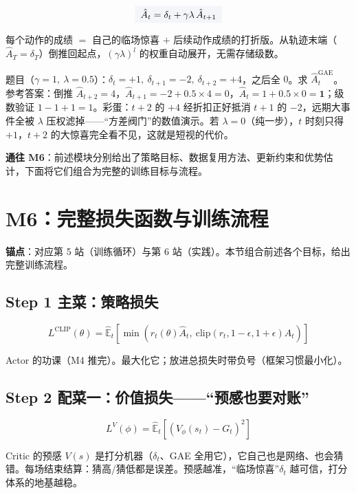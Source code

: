 \documentclass[UTF8,12pt,a4paper]{ctexrep}
\renewcommand{\boxed}[1]{{\colorbox{lightgray}{$\displaystyle #1$}}}
\newcommand{\plain}[1]{\begin{plainbox}#1\end{plainbox}}
\newcommand{\selfcheck}[1]{\begin{checkb}#1\end{checkb}}
\begin{document}
$$
\boxed{\;\hat{A}_t = \delta_t + \gamma\lambda\, \hat{A}_{t+1}\;}
$$

\plain{每个动作的成绩 $=$ 自己的临场惊喜 $+$ 后续动作成绩的打折版。从轨迹末端（$\hat{A}_T = \delta_T$）倒推回起点，$(\gamma\lambda)^l$ 的权重自动展开，无需存储级数。}

\selfcheck{题目（$\gamma=1,\ \lambda=0.5$）：$\delta_t = +1,\ \delta_{t+1} = -2,\ \delta_{t+2} = +4$，之后全 $0$。求 $\hat{A}^{\mathrm{GAE}}_t$。\quad 参考答案：倒推 $\hat{A}_{t+2} = 4$，$\hat{A}_{t+1} = -2 + 0.5\times 4 = 0$，$\hat{A}_t = 1 + 0.5\times 0 = \mathbf{1}$；级数验证 $1 - 1 + 1 = 1$。彩蛋：$t+2$ 的 $+4$ 经折扣正好抵消 $t+1$ 的 $-2$，远期大事件全被 $\lambda$ 压权滤掉——``方差阀门''的数值演示。若 $\lambda = 0$（纯一步），$t$ 时刻只得 $+1$，$t+2$ 的大惊喜完全看不见，这就是短视的代价。}

\textbf{通往 M6}：前述模块分别给出了策略目标、数据复用方法、更新约束和优势估计，下面将它们组合为完整的训练目标与流程。

\section{M6：完整损失函数与训练流程}

\textbf{锚点}：对应第 5 站（训练循环）与第 6 站（实践）。本节组合前述各个目标，给出完整训练流程。

\subsection*{Step 1 \; 主菜：策略损失}

$$
L^{\mathrm{CLIP}}(\theta) = \hat{\mathbb{E}}_t\left[\min\left(r_t(\theta)\hat{A}_t,\ \mathrm{clip}(r_t,1-\epsilon,1+\epsilon)\hat{A}_t\right)\right]
$$

Actor 的功课（M4 推完）。最大化它；放进总损失时带负号（框架习惯最小化）。

\subsection*{Step 2 \; 配菜一：价值损失——``预感也要对账''}

$$
L^{V}(\phi) = \hat{\mathbb{E}}_t\left[\left(V_\phi(s_t) - G_t\right)^2\right]
$$

\plain{Critic 的预感 $V(s)$ 是打分机器（$\delta_t$、GAE 全用它），它自己也是网络、也会猜错。每场结束结算：猜高/猜低都是误差。预感越准，``临场惊喜''$\delta_t$ 越可信，打分体系的地基越稳。}
\end{document}
